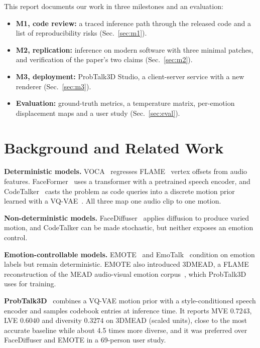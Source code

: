\documentclass[10pt,twocolumn,letterpaper]{article}
\begin{document}
This report documents our work in three milestones and an evaluation:
\begin{itemize}
\item \textbf{M1, code review:} a traced inference path through the released code and a list of reproducibility risks (Sec.~\ref{sec:m1}).
\item \textbf{M2, replication:} inference on modern software with three minimal patches, and verification of the paper's two claims (Sec.~\ref{sec:m2}).
\item \textbf{M3, deployment:} ProbTalk3D Studio, a client-server service with a new renderer (Sec.~\ref{sec:m3}).
\item \textbf{Evaluation:} ground-truth metrics, a temperature matrix, per-emotion displacement maps and a user study (Sec.~\ref{sec:eval}).
\end{itemize}

\section{Background and Related Work}
\textbf{Deterministic models.} VOCA~\cite{voca} regresses FLAME~\cite{flame} vertex offsets from audio features. FaceFormer~\cite{faceformer} uses a transformer with a pretrained speech encoder, and CodeTalker~\cite{codetalker} casts the problem as code queries into a discrete motion prior learned with a VQ-VAE~\cite{vqvae}. All three map one audio clip to one motion.

\textbf{Non-deterministic models.} FaceDiffuser~\cite{facediffuser} applies diffusion to produce varied motion, and CodeTalker can be made stochastic, but neither exposes an emotion control.

\textbf{Emotion-controllable models.} EMOTE~\cite{emote} and EmoTalk~\cite{emotalk} condition on emotion labels but remain deterministic. EMOTE also introduced 3DMEAD, a FLAME reconstruction of the MEAD audio-visual emotion corpus~\cite{mead}, which ProbTalk3D uses for training.

\textbf{ProbTalk3D}~\cite{probtalk3d} combines a VQ-VAE motion prior with a style-conditioned speech encoder and samples codebook entries at inference time. It reports MVE $0.7243$, LVE $0.6040$ and diversity $0.3274$ on 3DMEAD (scaled units), close to the most accurate baseline while about 4.5 times more diverse, and it was preferred over FaceDiffuser and EMOTE in a 69-person user study.
\end{document}
